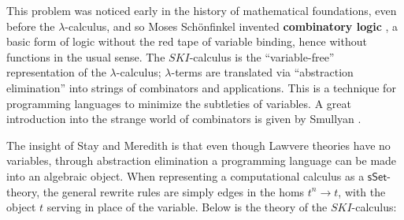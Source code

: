 \documentclass{amsart}
\theoremstyle{definition}
\newcommand{\sSet}{\mathsf{sSet}}
\begin{document}
This problem was noticed early in the history of mathematical foundations, even before the $\lambda$-calculus, and so Moses Sch\"onfinkel invented \textbf{combinatory logic} \cite{combs}, a basic form of logic without the red tape of variable binding, hence without functions in the usual sense. The $SKI$-calculus is the ``variable-free'' representation of the $\lambda$-calculus; $\lambda$-terms are translated via ``abstraction elimination'' into strings of combinators and applications. This is a technique for programming languages to minimize the subtleties of variables. A great introduction into the strange world of combinators is given by Smullyan \cite{tmam}.

The insight of Stay and Meredith \cite{roswelt} is that even though Lawvere theories have no variables, through abstraction elimination a programming language can be made into an algebraic object. When representing a computational calculus as a $\sSet$-theory, the general rewrite rules are simply edges in the homs $t^n \to t$, with the object $t$ serving in place of the variable. Below is the theory of the $SKI$-calculus:
\end{document}
